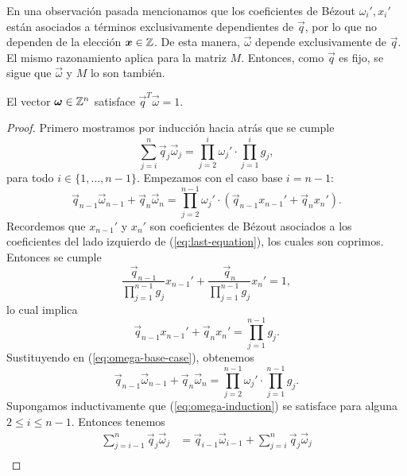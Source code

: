 En una observación pasada mencionamos que los coeficientes de Bézout $\omega_i', x_i'$ están
asociados a términos exclusivamente dependientes de $\vec{q}$, por lo que no dependen de la elección
$\boldsymbol{x} \in \mathbb{Z}$. De esta manera, $\vec{\omega}$ depende exclusivamente de $\vec{q}$. El mismo
razonamiento aplica para la matriz $M$. Entonces, como $\vec{q}$ es fijo, se sigue que
$\vec{\omega}$ y $M$ lo son también.

\begin{lemma} \label{lemma:iso1} El vector $\boldsymbol{\omega} \in \mathbb{Z}^n$ satisface $\vec{q}^T\vec{\omega}
	= 1$.
\end{lemma}
\begin{proof}
	Primero mostramos por inducción hacia atrás que se cumple
	\begin{equation}
		\label{eq:omega-induction} \sum_{j=i}^{n}\vec{q}_j\vec{\omega}_j =
		\prod_{j=2}^{i}\omega_j' \cdot \prod_{j=1}^{i}g_j,
	\end{equation}
	para todo $i \in \lbrace 1, \ldots, n - 1\rbrace$. Empezamos con el caso base $i = n - 1$:
	\begin{equation}
		\label{eq:omega-base-case}
		\vec{q}_{n-1}\vec{\omega}_{n-1} + \vec{q}_n\vec{\omega}_n =
		\prod_{j=2}^{n-1}\omega_j' \cdot \left(\vec{q}_{n-1}x_{n-1}' + \vec{q}_nx_n'\right).
	\end{equation}
	Recordemos que $x_{n-1}'$ y $x_n'$ son coeficientes de Bézout asociados a los coeficientes del
	lado izquierdo de (\ref{eq:last-equation}), los cuales son coprimos. Entonces se cumple
	\begin{equation*}
		\frac{\vec{q}_{n-1}}{\prod_{j=1}^{n-1}g_j}x_{n-1}' +
		\frac{\vec{q}_n}{\prod_{j=1}^{n-1}g_j}x_n' = 1,
	\end{equation*}
	lo cual implica 
	\begin{equation*}
		\vec{q}_{n-1}x_{n-1}' + \vec{q}_nx_n' = \prod_{j=1}^{n-1}g_j.
	\end{equation*}
	Sustituyendo en (\ref{eq:omega-base-case}), obtenemos
	\begin{equation*}
		\vec{q}_{n-1}\vec{\omega}_{n-1} + \vec{q}_n\vec{\omega}_n  =
		\prod_{j=2}^{n-1}\omega_j' \cdot \prod_{j=1}^{n-1}g_j.
	\end{equation*}
	Supongamos inductivamente que (\ref{eq:omega-induction}) se satisface para alguna $2 \leq i \leq
	n - 1$. Entonces tenemos
	\begin{align*}
		\sum_{j=i-1}^{n}\vec{q}_j\vec{\omega}_j
		&= \vec{q}_{i-1}\vec{\omega}_{i-1} + \sum_{j=i}^{n}\vec{q}_j\vec{\omega}_j \\

\end{align*}
\end{proof}
